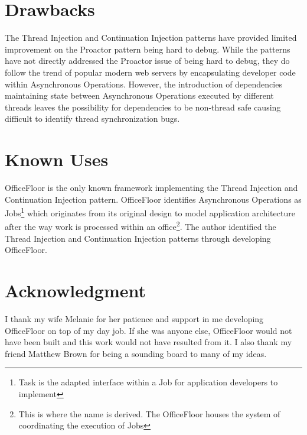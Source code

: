 \documentclass[prodmode]{style/acmlarge}
\begin{document}
\section{Drawbacks}

The Thread Injection and Continuation Injection patterns have provided limited
improvement on the Proactor pattern being hard to debug.  While the patterns
have not directly addressed the Proactor issue of being hard to debug, they do
follow the trend of popular modern web servers by encapsulating developer code
within Asynchronous Operations.  However, the introduction of dependencies
maintaining state between Asynchronous Operations executed by different threads
leaves the possibility for dependencies to be non-thread safe causing difficult
to identify thread synchronization bugs.


\section{Known Uses}

OfficeFloor \cite{officefloor} is the only known framework implementing the
Thread Injection and Continuation Injection pattern.  OfficeFloor identifies
Asynchronous Operations as Jobs\footnote{Task is the adapted interface within a
Job for application developers to implement} which originates from its original
design to model application architecture after the way work is processed within
an office\footnote{This is where the name is derived. The OfficeFloor houses
the system of coordinating the execution of Jobs}.  The author identified the
Thread Injection and Continuation Injection patterns through developing
OfficeFloor.


\section*{Acknowledgment} I thank my wife Melanie for her patience and support
in me developing OfficeFloor on top of my day job.  If she was anyone else,
OfficeFloor would not have been built and this work would not have resulted from
it.  I also thank my friend Matthew Brown for being a sounding board to many of
my ideas.




\end{document}
